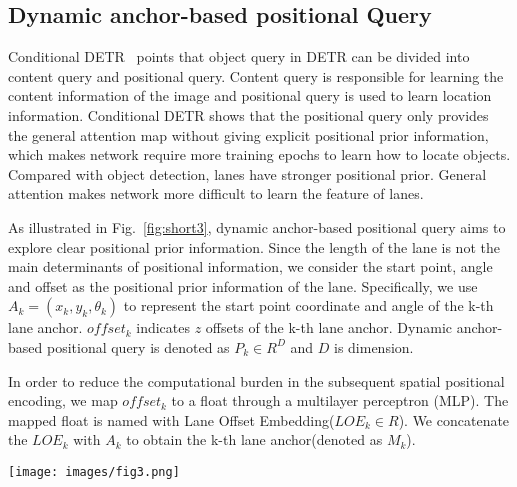 \documentclass{bmvc2k}
\begin{document}
\subsection{Dynamic anchor-based positional Query}
\label{sec:dynamic}
Conditional DETR~\cite{meng2021conditional} points that object query in DETR can be divided into content 
query and positional query. Content query is responsible for learning the content 
information of the image and positional query is used to learn location information. 
Conditional DETR shows that the positional query only provides the general attention 
map without giving explicit positional prior information, which makes 
network require more training epochs to learn how to locate objects. Compared with object detection, 
lanes have stronger positional prior. General attention makes network more difficult to learn the feature of lanes. 

As illustrated in Fig.~\ref{fig:short3}, dynamic anchor-based positional query aims to explore clear positional prior information. 
Since the length of the lane is not the main determinants of positional information, 
we consider the start point, angle and offset as the positional prior information of the lane.
Specifically, we use $A_k=\left(x_k,y_k,\theta_k\right)$ to represent the start point coordinate and angle of the k-th lane anchor. $offset_k$ indicates $z$ offsets of the k-th lane anchor.
Dynamic anchor-based positional query is denoted as $ P_k\in R^D$ and $D$ is dimension. 

In order to reduce the computational burden in the subsequent spatial positional encoding,
we map $offset_k$ to a float through a multilayer perceptron (MLP).
The mapped float is named with Lane Offset Embedding(${LOE}_k\in R$). We concatenate the ${LOE}_k$ with $A_k$ to 
obtain the k-th lane anchor(denoted as $M_k$).
\begin{figure*}[!h]
   \begin{center}
   \texttt{[image: images/fig3.png]}
   \vspace{-0.5cm} 
   \end{center}
      \caption{Structure of Decoder Layer. Q, K and V represent Query, Key and Value.}
      \vspace{-0.5cm}
   \label{fig:short3}
   \end{figure*} 

\vspace{-0.35cm}
\end{document}
